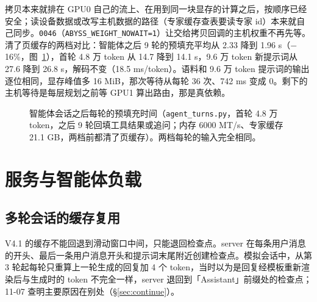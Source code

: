 \documentclass[11pt,a4paper]{article}
\newcommand{\code}[1]{\texttt{#1}}
\begin{document}
拷贝本来就排在 GPU0 自己的流上、在用到同一块显存的计算之后，按顺序已经安全；读设备数据或改写主机数据的路径（专家缓存查表要读专家 id）本来就自己同步。\code{0046}（\code{ABYSS\_WEIGHT\_NOWAIT=1}）让交给拷贝回调的主机权重不再先等。清了页缓存的两档对比：智能体之后 9 轮的预填充平均从 2.33 降到 1.96 s（$-$16\%，图~\ref{fig:nowait}），首轮 4.8 万 token 从 14.7 降到 14.1 s，9.6 万 token 新提示词从 27.6 降到 26.8 s，解码不变（18.5 ms/token）。语料和 9.6 万 token 提示词的输出逐位相同，显存峰值多 16 MiB，那次等待从每轮 36 次、742 ms 变成 0。剩下的主机等待是每层规划之前等 GPU1 算出路由，那是真依赖。

\begin{figure}[t]
  \centering
  \caption{智能体会话之后每轮的预填充时间（\code{agent\_turns.py}，首轮 4.8 万 token，之后 9 轮回填工具结果或追问；内存 6000 MT/s、专家缓存 21.1 GB，两档前都清了页缓存）。两档每轮的输入完全相同。}
  \label{fig:nowait}
\end{figure}

\section{服务与智能体负载}

\subsection{多轮会话的缓存复用}

V4.1 的缓存不能回退到滑动窗口中间，只能退回检查点。server 在每条用户消息的开头、最后一条用户消息开头和提示词末尾附近创建检查点。模拟会话中，从第 3 轮起每轮只重算上一轮生成的回复加 4 个 token，当时以为是回复经模板重新渲染后与生成时的 token 不完全一样，server 退回到「Assistant」前缀处的检查点；11-07 查明主要原因在别处（\S\ref{sec:continue}）。
\end{document}

